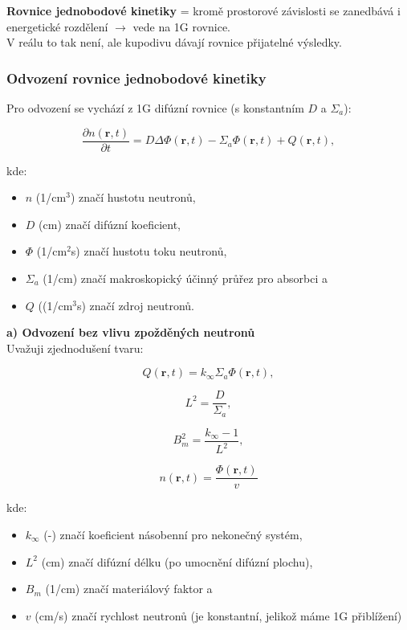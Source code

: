 \textbf{Rovnice jednobodové kinetiky} = kromě prostorové závislosti se zanedbává i energetické rozdělení $\rightarrow$ vede na 1G rovnice.\\

V reálu to tak není, ale kupodivu dávají rovnice přijatelné výsledky.

\subsubsection{Odvození rovnice jednobodové kinetiky}

Pro odvození se vychází z 1G difúzní rovnice (s konstantním $D$ a $\Sigma_a$):

\begin{equation}
  \dfrac{\partial n(\textbf{r}, t)}{\partial t} = D \Delta \Phi (\textbf{r}, t) - \Sigma_a \Phi (\textbf{r}, t) + Q (\textbf{r}, t),
  \label{difuzka}
\end{equation}

kde:

\begin{itemize}
  \item $n$ (1/cm$^3$) značí hustotu neutronů,
  \item $D$ (cm) značí difúzní koeficient,
  \item $\Phi$ (1/cm$^2$s) značí hustotu toku neutronů,
  \item $\Sigma_a$ (1/cm) značí makroskopický účinný průřez pro absorbci a
  \item $Q$ ((1/cm$^3$s) značí zdroj neutronů.
\end{itemize}

\textbf{a) Odvození bez vlivu zpožděných neutronů}\\

Uvažuji zjednodušení tvaru:

$$ Q (\textbf{r}, t) = k_\infty \Sigma_a \Phi (\textbf{r}, t), $$

$$ L^2 = \dfrac{D}{\Sigma_a}, $$

$$ B_m^2 = \dfrac{k_\infty - 1}{L^2}, $$

$$ n(\textbf{r}, t) = \dfrac{\Phi (\textbf{r}, t)}{v}$$

kde:

\begin{itemize}
  \item $k_\infty$ (-) značí koeficient násobenní pro nekonečný systém,
  \item $L^2$ (cm) značí difúzní délku (po umocnění difúzní plochu),
  \item $B_m$ (1/cm) značí materiálový faktor a
  \item $v$ (cm/s) značí rychlost neutronů (je konstantní, jelikož máme 1G přiblížení)
\end{itemize}

